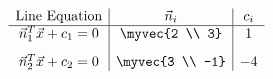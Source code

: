 \[
\begin{array}{c|c|c}
\text{Line Equation} & \vec{n}_i & c_i \\ \hline
\vec{n}_1^{T}\vec{x} + c_1 = 0 & \myvec{2 \\ 3} & 1 \\[8pt]
\vec{n}_2^{T}\vec{x} + c_2 = 0 & \myvec{3 \\ -1} & -4
\end{array}
\]